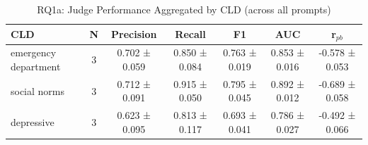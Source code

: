 \begin{table}[htbp]
\centering
\caption{RQ1a: Judge Performance Aggregated by CLD (across all prompts)}
\label{tab:rq1a_by_cld}
\begin{tabular}{lcccccc}
\toprule
\textbf{CLD} & \textbf{N} & \textbf{Precision} & \textbf{Recall} & \textbf{F1} & \textbf{AUC} & \textbf{r$_{pb}$} \\
\midrule
emergency department & 3 & 0.702 ± 0.059 & 0.850 ± 0.084 & 0.763 ± 0.019 & 0.853 ± 0.016 & -0.578 ± 0.053 \\
social norms & 3 & 0.712 ± 0.091 & 0.915 ± 0.050 & 0.795 ± 0.045 & 0.892 ± 0.012 & -0.689 ± 0.058 \\
depressive & 3 & 0.623 ± 0.095 & 0.813 ± 0.117 & 0.693 ± 0.041 & 0.786 ± 0.027 & -0.492 ± 0.066 \\
\bottomrule
\end{tabular}
\end{table}